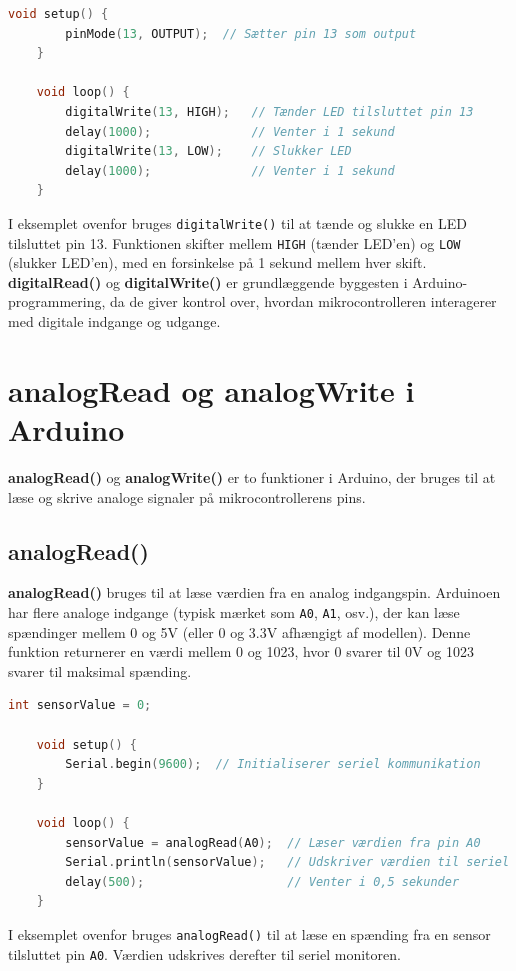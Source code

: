 \begin{lstlisting}[language=C++, caption=Eksempel på brug af digitalWrite]
	void setup() {
		pinMode(13, OUTPUT);  // Sætter pin 13 som output
	}
	
	void loop() {
		digitalWrite(13, HIGH);   // Tænder LED tilsluttet pin 13
		delay(1000);              // Venter i 1 sekund
		digitalWrite(13, LOW);    // Slukker LED
		delay(1000);              // Venter i 1 sekund
	}
\end{lstlisting}
I eksemplet ovenfor bruges \texttt{digitalWrite()} til at tænde og slukke en LED tilsluttet pin 13. Funktionen skifter mellem \texttt{HIGH} (tænder LED'en) og \texttt{LOW} (slukker LED'en), med en forsinkelse på 1 sekund mellem hver skift.
\newline\newline\noindent
\textbf{digitalRead()} og \textbf{digitalWrite()} er grundlæggende byggesten i Arduino-programmering, da de giver kontrol over, hvordan mikrocontrolleren interagerer med digitale indgange og udgange.

\section{analogRead og analogWrite i Arduino}
\textbf{analogRead()} og \textbf{analogWrite()} er to funktioner i Arduino, der bruges til at læse og skrive analoge signaler på mikrocontrollerens pins.

\subsection{analogRead()}
\textbf{analogRead()} bruges til at læse værdien fra en analog indgangspin. Arduinoen har flere analoge indgange (typisk mærket som \texttt{A0}, \texttt{A1}, osv.), der kan læse spændinger mellem 0 og 5V (eller 0 og 3.3V afhængigt af modellen). Denne funktion returnerer en værdi mellem 0 og 1023, hvor 0 svarer til 0V og 1023 svarer til maksimal spænding.
\begin{lstlisting}[language=C++, caption=Eksempel på brug af analogRead]
	int sensorValue = 0;
	
	void setup() {
		Serial.begin(9600);  // Initialiserer seriel kommunikation
	}
	
	void loop() {
		sensorValue = analogRead(A0);  // Læser værdien fra pin A0
		Serial.println(sensorValue);   // Udskriver værdien til seriel monitor
		delay(500);                    // Venter i 0,5 sekunder
	}
\end{lstlisting}
I eksemplet ovenfor bruges \texttt{analogRead()} til at læse en spænding fra en sensor tilsluttet pin \texttt{A0}. Værdien udskrives derefter til seriel monitoren.

